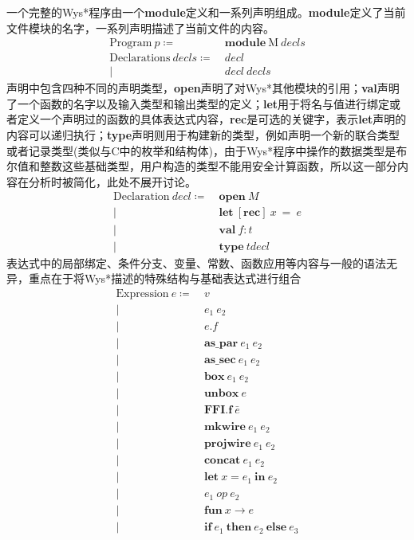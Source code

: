 一个完整的Wys*程序由一个\textbf{module}定义和一系列声明组成。\textbf{module}定义了当前文件模块的名字，一系列声明描述了当前文件的内容。
\begin{equation*}
\begin{split}
\text{Program}\ p \coloneqq &\  \textbf{module}\  \text{M}\  decls \\
\text{Declarations}\ decls \coloneqq &\ decl \\
\vert &\ decl\ decls 
\end{split}
\end{equation*}
声明中包含四种不同的声明类型，\textbf{open}声明了对Wys*其他模块的引用；\textbf{val}声明了一个函数的名字以及输入类型和输出类型的定义；\textbf{let}用于将名与值进行绑定或者定义一个声明过的函数的具体表达式内容，\textbf{rec}是可选的关键字，表示\textbf{let}声明的内容可以递归执行；\textbf{type}声明则用于构建新的类型，例如声明一个新的联合类型或者记录类型(类似与C中的枚举和结构体)，由于Wys*程序中操作的数据类型是布尔值和整数这些基础类型，用户构造的类型不能用安全计算函数，所以这一部分内容在分析时被简化，此处不展开讨论。
\begin{equation*}
\begin{split}
\text{Declaration}\ decl \coloneqq &\  \textbf{open}\  M\\
\vert &\ \textbf{let}\ [\textbf{rec}]\ x\ =\ e\\
\vert &\ \textbf{val}\ f\colon t \\
\vert &\ \textbf{type}\ tdecl
\end{split}
\end{equation*}
表达式中的局部绑定、条件分支、变量、常数、函数应用等内容与一般的语法无异，重点在于将Wys*描述的特殊结构与基础表达式进行组合
\begin{equation*}
\begin{split}
\text{Expression}\ e \coloneqq &\  v \\
\vert &\  e_1\  e_2 \\
\vert &\  e.f \\
\vert &\ \textbf{as\_par}\ e_1\ e_2 \\
\vert &\ \textbf{as\_sec}\ e_1\ e_2 \\
\vert &\ \textbf{box}\ e_1\ e_2 \\
\vert &\ \textbf{unbox}\ e \\
\vert &\ \textbf{FFI.f}\ \bar{e} \\
\vert &\ \textbf{mkwire}\ e_1\ e_2 \\
\vert &\ \textbf{projwire}\ e_1\ e_2 \\
\vert &\ \textbf{concat}\ e_1\ e_2 \\
\vert &\  \textbf{let}\  x=e_1\ \textbf{in}\ e_2  \\
\vert &\  e_1\ op\ e_2 \\
\vert &\  \textbf{fun}\ x \to e  \\
\vert &\ \textbf{if}\ e_1 \ \textbf{then}\ e_2 \ \textbf{else}\ e_3 
\end{split}
\end{equation*}
